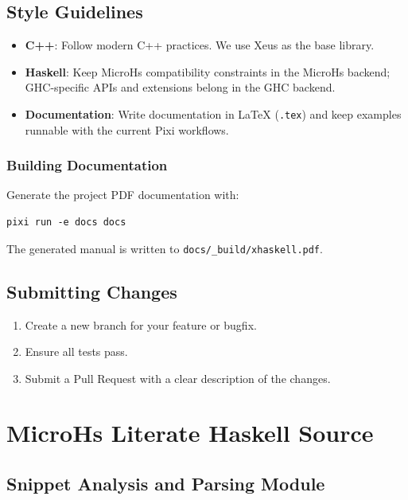 \documentclass[11pt]{scrartcl}
\begin{document}
\subsection{Style Guidelines}


\begin{itemize}
\item \textbf{C++}: Follow modern C++ practices. We use Xeus as the base library.
\item \textbf{Haskell}: Keep MicroHs compatibility constraints in the MicroHs backend; GHC-specific APIs and extensions belong in the GHC backend.
\item \textbf{Documentation}: Write documentation in LaTeX (\texttt{.tex}) and keep examples runnable with the current Pixi workflows.
\end{itemize}

\subsubsection{Building Documentation}

Generate the project PDF documentation with:
\begin{verbatim}
pixi run -e docs docs
\end{verbatim}

The generated manual is written to \texttt{docs/\_build/xhaskell.pdf}.



\subsection{Submitting Changes}


\begin{enumerate}
\item Create a new branch for your feature or bugfix.
\item Ensure all tests pass.
\item Submit a Pull Request with a clear description of the changes.
\end{enumerate}


\clearpage
\section{MicroHs Literate Haskell Source}

\subsection{Snippet Analysis and Parsing Module}

\end{document}

